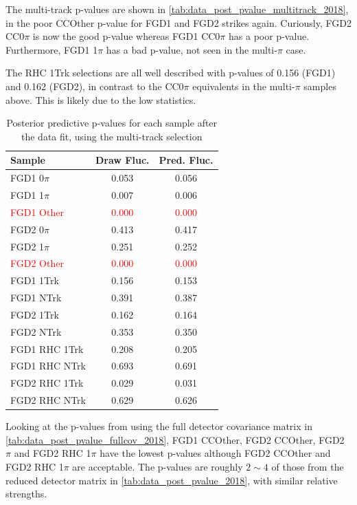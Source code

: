The multi-track p-values are shown in \autoref{tab:data_post_pvalue_multitrack_2018}, in the poor CCOther p-value for FGD1 and FGD2 strikes again. Curiously, FGD2 CC0$\pi$ is now the good p-value whereas FGD1 CC0$\pi$ has a poor p-value. Furthermore, FGD1 1$\pi$ has a bad p-value, not seen in the multi-$\pi$ case.

The RHC 1Trk selections are all well described with p-values of 0.156 (FGD1) and 0.162 (FGD2), in contrast to the CC0$\pi$ equivalents in the multi-$\pi$ samples above. This is likely due to the low statistics.
\begin{table}[h]
	\centering
	\begin{tabular}{l | c c }
		\hline \hline
		Sample & Draw Fluc. & Pred. Fluc. \\
		\hline
		FGD1 0$\pi$ & 0.053 & 0.056 \\
		FGD1 1$\pi$ & 0.007 & 0.006 \\
		\textcolor{red}{FGD1 Other}  & \textcolor{red}{0.000} & \textcolor{red}{0.000} \\
		\hline
		FGD2 0$\pi$ & 0.413 & 0.417 \\
		FGD2 1$\pi$ & 0.251 & 0.252 \\
		\textcolor{red}{FGD2 Other}  & \textcolor{red}{0.000} & \textcolor{red}{0.000} \\
		\hline
		FGD1 \numubar 1Trk & 0.156 & 0.153 \\
		FGD1 \numubar NTrk  & 0.391 & 0.387 \\
		\hline
		FGD2 \numubar 1Trk & 0.162 & 0.164 \\
		FGD2 \numubar NTrk  & 0.353 & 0.350 \\
		\hline
		FGD1 \numu RHC 1Trk & 0.208 & 0.205 \\
		FGD1 \numu RHC NTrk  & 0.693 & 0.691 \\
		\hline
		FGD2 \numu RHC 1Trk & 0.029 & 0.031 \\
		FGD2 \numu RHC NTrk  & 0.629 & 0.626 \\
		\hline
		\hline
	\end{tabular}
	\caption{Posterior predictive p-values for each sample after the data fit, using the multi-track selection}
	\label{tab:data_post_pvalue_multitrack_2018}
\end{table}

Looking at the p-values from using the full detector covariance matrix in \autoref{tab:data_post_pvalue_fullcov_2018}, FGD1 CCOther, FGD2 CCOther, FGD2 $\pi$ and FGD2 \numu RHC 1$\pi$ have the lowest p-values although FGD2 CCOther and FGD2 \numu RHC 1$\pi$ are acceptable. The p-values are roughly $2\sim4$ of those from the reduced detector matrix in \autoref{tab:data_post_pvalue_2018}, with similar relative strengths. 

